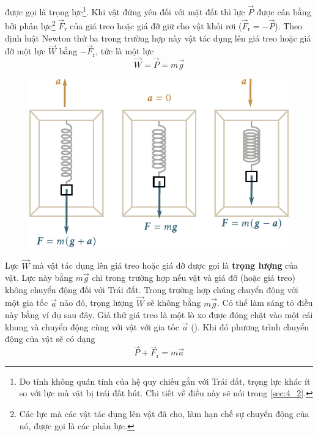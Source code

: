 \noindent
được gọi là trọng lực\footnote{Do tính không quán tính của hệ quy chiếu gắn với Trái đất, trọng lực khác ít so với lực mà vật bị trái đất hút. Chi tiết về điều này sẽ nói trong \ref{sec:4_2}.}. Khi vật đứng yên đối với mặt đất thì lực $\vec{P}$ được cân bằng bởi phản lực\footnote{Các lực mà các vật tác dụng lên vật đã cho, làm hạn chế sự chuyển động của nó, được gọi là các phản lực.} $\vec{F}_{\text{r}}$ của giá treo hoặc giá đỡ giữ cho vật khỏi rơi ($\vec{F}_{\text{r}}=-\vec{P}$). Theo định luật Newton thứ ba trong trường hợp này vật tác dụng lên giá treo hoặc giá đỡ một lực $\vec{W}$ bằng $-\vec{F}_{\text{r}}$, tức là một lực
\begin{equation*}
\vec{W} = \vec{P} = m\vec{g}
\end{equation*}

\begin{figure}[!htb]
	\begin{center}
		\includegraphics[scale=1]{figures/ch_02/fig_2_11.pdf}
		\caption[]{}
		\label{fig:2_11}
	\end{center}
\end{figure}

Lực $\vec{W}$ mà vật tác dụng lên giá treo hoặc giá đỡ được gọi là \textbf{trọng lượng} của vật. Lực này bằng $m\vec{g}$ chỉ trong trường hợp nếu vật và giá đỡ (hoặc giá treo) không chuyển động đối với Trái đất. Trong trường hợp chúng chuyển động với một gia tốc $\vec{a}$ nào đó, trọng lượng $\vec{W}$ sẽ không bằng $m\vec{g}$. Có thể làm sáng tỏ điều này bằng ví dụ sau đây. Giả thử giá treo là một lò xo được đóng chặt vào một cái khung và chuyển động cùng với vật với gia tốc $\vec{a}$ (). Khi đó phương trình chuyển động của vật sẽ có dạng
\begin{equation}\label{eq:2_39}
\vec{P} + \vec{F}_{\text{r}} = m\vec{a}
\end{equation}

